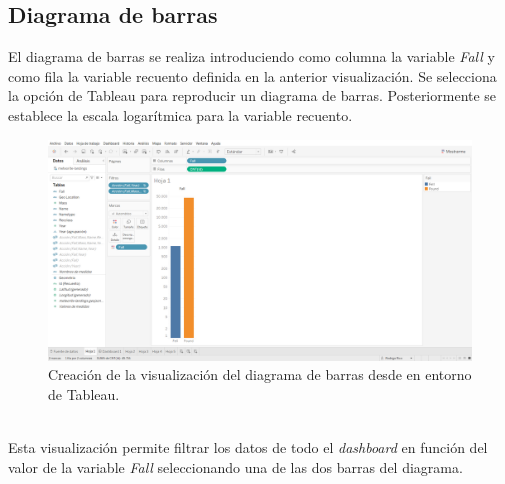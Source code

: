 \documentclass[12pt]{article}
\begin{document}
	\subsection{Diagrama de barras}
	El diagrama de barras se realiza introduciendo como columna la variable \textit{Fall} y como fila la variable recuento definida en la anterior visualización. Se selecciona la opción de Tableau para reproducir un diagrama de barras. Posteriormente se establece la escala logarítmica para la variable recuento.\\
	\begin{figure}[h]
		\centering
		\label{Fig:barras}
		\includegraphics[width=\textwidth]{Captura de pantalla (66)}
		\caption{Creación de la visualización del diagrama de barras desde en entorno de Tableau.}
	\end{figure}
	\\
	Esta visualización permite filtrar los datos de todo el \textit{dashboard} en función del valor de la variable \textit{Fall} seleccionando una de las dos barras del diagrama.
	\clearpage
\end{document}
